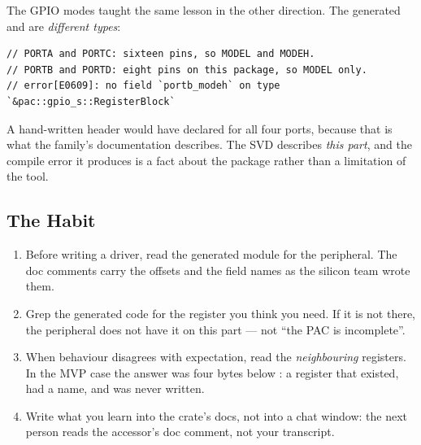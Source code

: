 The GPIO modes taught the same lesson in the other direction. The generated 
and  are \emph{different types}:

\begin{verbatim}
// PORTA and PORTC: sixteen pins, so MODEL and MODEH.
// PORTB and PORTD: eight pins on this package, so MODEL only.
// error[E0609]: no field `portb_modeh` on type `&pac::gpio_s::RegisterBlock`
\end{verbatim}

A hand-written header would have declared  for all four ports, because that is what
the family's documentation describes. The SVD describes \emph{this part}, and the compile error it
produces is a fact about the package rather than a limitation of the tool.

\subsection{The Habit}

\begin{enumerate}
    \item Before writing a driver, read the generated module for the peripheral. The doc comments
          carry the offsets and the field names as the silicon team wrote them.
    \item Grep the generated code for the register you think you need. If it is not there, the
          peripheral does not have it on this part — not ``the PAC is incomplete''.
    \item When behaviour disagrees with expectation, read the \emph{neighbouring} registers. In the
          MVP case the answer was four bytes below : a register that existed, had a
          name, and was never written.
    \item Write what you learn into the crate's docs, not into a chat window: the next person reads
          the accessor's doc comment, not your transcript.
\end{enumerate}
